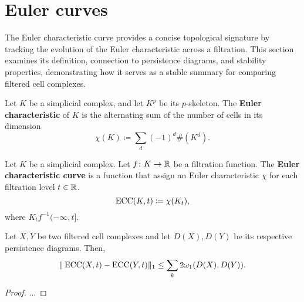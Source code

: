 \section{Euler curves}  \label{sec:euler-curves}

The Euler characteristic curve provides a concise topological signature by tracking the evolution of the Euler characteristic across a filtration. This section examines its definition, connection to persistence diagrams, and stability properties, demonstrating how it serves as a stable summary for comparing filtered cell complexes.

\begin{definition}
    Let $ K $ be a simplicial complex, and let $ K^p $ be its $p$-skeleton. The {\bf Euler characteristic} of $ K $ is the alternating sum of the number of cells in its dimension
    \begin{equation}
        \chi(K) \coloneq \sum_d (-1)^d \#(K^d).
    \end{equation}
\end{definition}

\begin{definition}
    Let $ K $ be a simplicial complex. Let $ f \colon K \to \mathbb R $ be a filtration function. The {\bf Euler characteristic curve} is a function that assign an Euler characteristic $ \chi $ for each filtration level $ t \in \mathbb R $. 
    \begin{equation}
        \operatorname{ECC}(K, t) \coloneq \chi(K_t),
    \end{equation}
    where $ K_t f^{-1} (-\infty, t] $.
\end{definition}

\begin{proposition}
    Let $ X, Y $ be two filtered cell complexes and let $ D(X), D(Y) $ be its respective persistence diagrams. Then,
    \begin{equation}
        \| \operatorname{ECC}(X, t) - \operatorname{ECC}(Y, t) \|_1 \leq \sum_k 2 \omega_1(D(X), D(Y)).
    \end{equation}
\end{proposition}
\begin{proof}
    ...
\end{proof}

